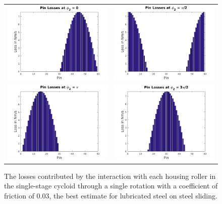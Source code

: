 \begin{figure}[h]
   \centering
   \begin{tabular}{cc}
	   \includegraphics[width=0.48\linewidth]{fig/single_power_0} &
	   \includegraphics[width=0.48\linewidth]{fig/single_power_pi2} \\
	   \includegraphics[width=0.48\linewidth]{fig/single_power_pi} &
	   \includegraphics[width=0.48\linewidth]{fig/single_power_3pi2}
   \end{tabular}
   \caption{The losses contributed by the interaction with each housing roller in the single-stage cycloid through a single rotation with a coefficient of friction of 0.03, the best estimate for lubricated steel on steel sliding.}
   \label{fig:single_losses}
\end{figure}

